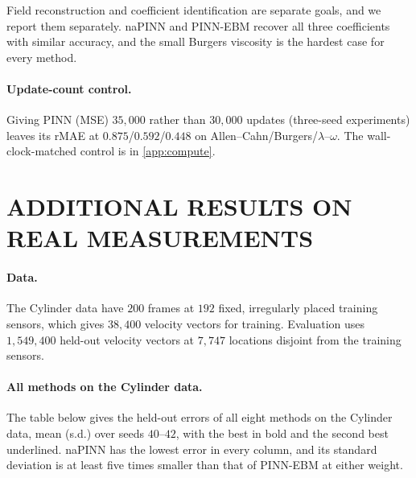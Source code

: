 \documentclass[twoside]{article}
\begin{document}
\noindent
Field reconstruction and coefficient identification are separate goals, and we
report them separately. naPINN and PINN-EBM recover all three coefficients with
similar accuracy, and the small Burgers viscosity is the hardest case for every
method.

\paragraph{Update-count control.}
Giving PINN (MSE) $35{,}000$ rather than $30{,}000$ updates (three-seed experiments)
leaves its rMAE at $0.875$/$0.592$/$0.448$ on
Allen--Cahn/Burgers/$\lambda$--$\omega$. The wall-clock-matched control is in
\cref{app:compute}.

\section{ADDITIONAL RESULTS ON REAL MEASUREMENTS}
\label{app:real}

\paragraph{Data.}
The Cylinder data have $200$ frames at $192$ fixed, irregularly placed training
sensors, which gives $38{,}400$ velocity vectors for training. Evaluation uses
$1{,}549{,}400$ held-out velocity vectors at $7{,}747$ locations disjoint from the
training sensors.

\paragraph{All methods on the Cylinder data.}
The table below gives the held-out errors of all eight methods on the Cylinder
data, mean (s.d.) over seeds $40$--$42$, with the best in bold and the second best
underlined. naPINN has the lowest error in every column, and its standard
deviation is at least five times smaller than that of PINN-EBM at either weight.
\end{document}
